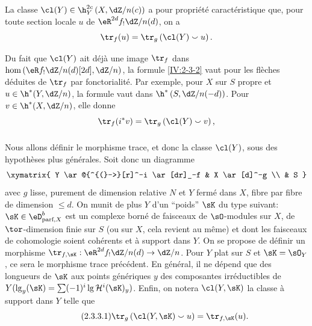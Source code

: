 \begin{definition}\label{IV:2-3-2}
La classe $\cl(Y)\in\h_Y^{2 c}\left(X,\dZ/n(c)\right)$ a pour propriété 
caractéristique que, pour toute section locale $u$ de $\eR^{2 d}f_! \dZ/n(d)$, 
on a 
\[
  \tr_f(u) = \tr_g\left(\cl(Y)\smallsmile u\right) \text{.}
\]
\end{definition}

Du fait que $\cl(Y)$ ait déjà une image $\tr_f$ dans 
$\hom\left(\eR f_!\dZ/n(d)[2 d],\dZ/n\right)$, la formule \ref{IV:2-3-2} vaut 
pour les flèches déduites de $\tr_f$ par fonctorialité. Par exemple, 
pour $X$ sur $S$ propre et $u\in \h^*(Y,\dZ/n)$, la formule vaut dans 
$\h^*\left(S,\dZ/n(-d)\right)$. Pour $v\in \h^*(X,\dZ/n)$, elle 
donne 
\[
  \tr_f(i^* v) = \tr_g\left(\cl(Y)\smallsmile v\right) \text{,}
\]





\subsubsection{}\label{IV:2-3-3}

Nous allons définir le morphisme trace, et donc la classe $\cl(Y)$, sous des 
hypothèses plus générales. Soit donc un diagramme 
\[\xymatrix{
  Y \ar@{^{(}->}[r]^-i \ar[dr]_-f 
    & X \ar[d]^-g \\
  & S
}\]
avec $g$ lisse, purement de dimension relative $N$ et $Y$ fermé dans $X$, 
fibre par fibre de dimension $\leqslant d$. On munit de plus $Y$ d'un 
``poids'' $\sK$ du type suivant: $\sK\in\eD_{\text{parf},X}^b$ est un 
complexe borné de faisceaux de $\sO$-modules sur $X$, de $\tor$-dimension 
finie sur $S$ (ou sur $X$, cela revient au même) et dont les faisceaux de 
cohomologie soient cohérents et à support dans $Y$. On se propose de 
définir un morphisme $\tr_{f,\sK}:\eR^{2 d}f_! \dZ/n(d) \to \dZ/n$. Pour $Y$ 
plat sur $S$ et $\sK=\sO_Y$, ce sera le morphisme trace précédent. En 
général, il ne dépend que des longueurs de $\sK$ aux points 
génériques $y$ des composantes irréductibles de 
$Y(\operatorname{lg}_y(\sK) = \sum (-1)^i \operatorname{lg} \mathcal{H}^i(\sK)_y)$. 
Enfin, on notera $\cl(Y,\sK)$ la classe à support dans $Y$ telle que 
\begin{equation*}\tag{2.3.3.1}\label{IV:eq:2-3-3-1}
  \tr_g\left(\cl(Y,\sK)\smallsmile u\right) = \tr_{f,\sK}(u) \text{.}
\end{equation*}





